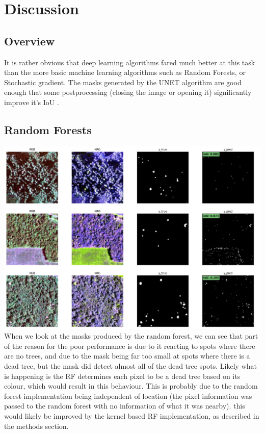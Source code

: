 \section{Discussion}
\subsection{Overview}
It is rather obvious that deep learning algorithms fared much better at this task than the more basic machine learning algorithms such as Random Forests, or Stochastic gradient. The masks generated by the UNET algorithm are good enough that some postprocessing (closing the image or opening it) significantly improve it's IoU .
\subsection{Random Forests}
\includegraphics[width=.95\linewidth]{figs/RFmask.jpg}\\
When we look at the masks produced by the random forest, we can see that part of the reason for the poor performance is due to it reacting to spots where there are no trees, and due to the mask being far too small at spots where there is a dead tree, but the mask did detect almost all of the dead tree spots.  Likely what is happening is the RF determines each pixel to be a dead tree based on its colour, which would result in this behaviour. This is probably due to the random forest implementation being independent of location (the pixel information was passed to the random forest with no information of what it was nearby). this would likely be improved by the kernel based RF implementation, as described in the methods section.
